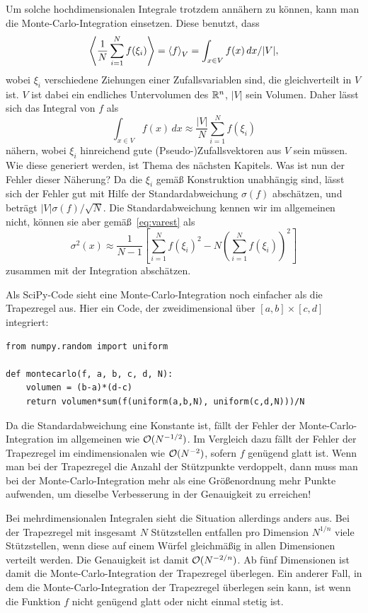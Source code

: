 Um solche hochdimensionalen Integrale trotzdem annähern zu können,
kann man die Monte-Carlo-Integration einsetzen. Diese benutzt, dass
\begin{equation}
  \left\langle{\frac{1}{N} \sum_{i=1}^N f(\xi_i)}\right\rangle = \left\langle{f}\right\rangle_{V} =
  \int_{x\in V} f(x)\,dx / |V|,
\end{equation}
wobei $\xi_i$ verschiedene Ziehungen einer Zufallsvariablen sind, die
gleichverteilt in $V$ ist. $V$ ist dabei ein endliches Untervolumen
des $\mathbb{R}^n$, $|V|$ sein Volumen. Daher lässt sich das Integral von $f$
als
\begin{equation}
  \int_{x\in V} f(x)\,dx \approx \frac{|V|}{N} \sum_{i=1}^N f(\xi_i)
\end{equation}
nähern, wobei $\xi_i$ hinreichend gute (Pseudo-)Zufallsvektoren aus
$V$ sein müssen. Wie diese generiert werden, ist Thema des nächsten
Kapitels. Was ist nun der Fehler dieser Näherung? Da die $\xi_i$ gemäß
Konstruktion unabhängig sind, lässt sich der Fehler gut mit Hilfe der
Standardabweichung $\sigma(f)$ abschätzen, und beträgt
$|V|\sigma(f)/\sqrt{N}$. Die Standardabweichung kennen wir im
allgemeinen nicht, können sie aber gemäß~\eqref{eq:varest} als
\begin{equation}
  \sigma^2(x) \approx \frac{1}{N-1} \left[\sum_{i=1}^N f(\xi_i)^2 -
    N\left(\sum_{i=1}^Nf(\xi_i)\right)^2\right]
\end{equation}
zusammen mit der Integration abschätzen.

Als SciPy-Code sieht eine Monte-Carlo-Integration noch einfacher als
die Trapezregel aus. Hier ein Code, der zweidimensional über
$[a,b]\times[c,d]$ integriert:
\begin{lstlisting}
from numpy.random import uniform

def montecarlo(f, a, b, c, d, N):
    volumen = (b-a)*(d-c)
    return volumen*sum(f(uniform(a,b,N), uniform(c,d,N)))/N
\end{lstlisting}

Da die Standardabweichung eine Konstante ist, fällt der Fehler der
Monte-Carlo-Integration im allgemeinen wie $\mathcal O(N^{-1/2})$. Im
Vergleich dazu fällt der Fehler der Trapezregel im eindimensionalen
wie $\mathcal O(N^{-2})$, sofern $f$ genügend glatt ist. Wenn man bei der
Trapezregel die Anzahl der Stützpunkte verdoppelt, dann muss man bei
der Monte-Carlo-Integration mehr als eine Größenordnung mehr Punkte
aufwenden, um dieselbe Verbesserung in der Genauigkeit zu erreichen!

Bei mehrdimensionalen Integralen sieht die Situation allerdings anders
aus. Bei der Trapezregel mit insgesamt $N$ Stützstellen entfallen pro
Dimension $N^{1/n}$ viele Stützstellen, wenn diese auf einem Würfel
gleichmäßig in allen Dimensionen verteilt werden.  Die Genauigkeit
ist damit $\mathcal O(N^{-2/n})$.  Ab fünf Dimensionen ist damit die
Monte-Carlo-Integration der Trapezregel überlegen.  Ein anderer Fall,
in dem die Monte-Carlo-Integration der Trapezregel überlegen sein
kann, ist wenn die Funktion $f$ nicht genügend glatt oder nicht einmal
stetig ist.

